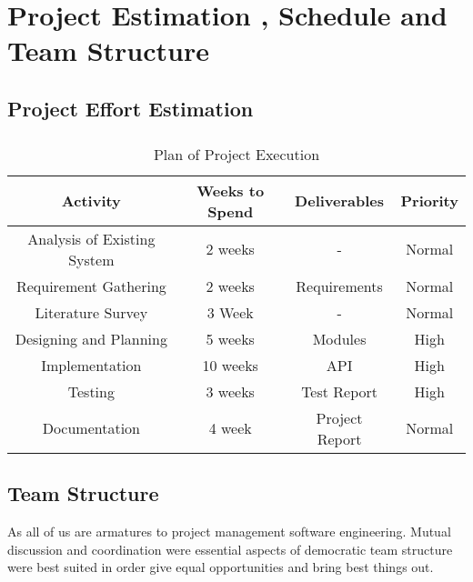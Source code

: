 \chapter{Project Estimation , Schedule and Team Structure}
\section{Project Effort Estimation}
\paragraph{}
\begin{table}[!htbp]
\begin{center}
\def\arraystretch{1.5}
  \begin{tabular}{| c | c | c | c |}
       \hline

	\textbf{Activity} & \textbf{Weeks to Spend} & \textbf{Deliverables} & \textbf{Priority}\\ \hline
	Analysis of Existing System & 2 weeks & - & Normal \\ \hline
	Requirement Gathering & 2 weeks & Requirements & Normal \\ \hline 
	Literature Survey & 3 Week & - & Normal \\ \hline
	Designing and Planning & 5 weeks & Modules & High \\ \hline
	Implementation & 10 weeks & API & High \\ \hline
	Testing & 3 weeks & Test Report & High \\ \hline
	Documentation & 4 week & Project Report & Normal \\ \hline
\end{tabular}
 \caption { Plan of Project Execution }
 \label{tab:hreq}
\end{center}

\end{table}

\section{Team Structure}
As all of us are armatures to project management software engineering. Mutual discussion and coordination were essential aspects of democratic team structure were best suited in order give equal opportunities and bring best things out.

